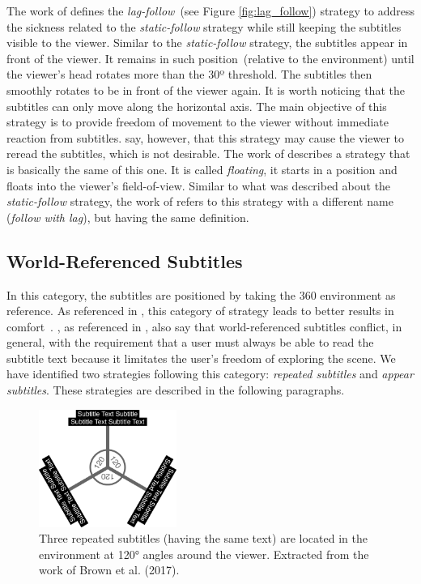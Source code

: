 The work of \cite{brown_subtitles_2017} defines the \emph{lag-follow}~(see Figure \ref{fig:lag_follow}) strategy to address the sickness related to the \emph{static-follow} strategy while still keeping the subtitles visible to the viewer. Similar to the \emph{static-follow} strategy, the subtitles appear in front of the viewer. It remains in such position~(relative to the environment) until the viewer's head rotates more than the 30º threshold. The subtitles then smoothly rotates to be in front of the viewer again. It is worth noticing that the subtitles can only move along the horizontal axis. The main objective of this strategy is to provide freedom of movement to the viewer without immediate reaction from subtitles. \cite{brown_subtitles_2017} say, however, that this strategy may cause the viewer to reread the subtitles, which is not desirable.
The work of \cite{matos_dynamic_2018} describes a strategy that is basically the same of this one. It is called \emph{floating}, it starts in a position and floats into the viewer's field-of-view. Similar to what was described about the \emph{static-follow} strategy, the work of \cite{montagud_culture_2020} refers to this strategy with a different name (\emph{follow with lag}), but having the same definition.

\subsection{World-Referenced Subtitles}
\label{subsec:world_referenced}

In this category, the subtitles are positioned by taking the 360 environment as reference. 
As referenced in \cite{hughes_disruptive_2019}, this category of strategy leads to better results in comfort~\cite{rothe2018positioning}. \cite{rothe2018positioning}, as referenced in \cite{hughes_disruptive_2019}, also say that world-referenced subtitles conflict, in general, with the requirement that a user must always be able to read the subtitle text because it limitates the user's freedom of exploring the scene.
We have identified two strategies following this category: \emph{repeated subtitles} and \emph{appear subtitles}. These strategies are described in the following paragraphs. 

\begin{figure}[!ht]
    \centering
    \includegraphics[width=0.4\textwidth]{img/video360/120_subtitles.png}
    \caption{Three repeated subtitles (having the same text) are located in the environment at 120° angles around the viewer. Extracted from the work of Brown et al. (2017).}
    \label{fig:120_subtitles}
\end{figure}

